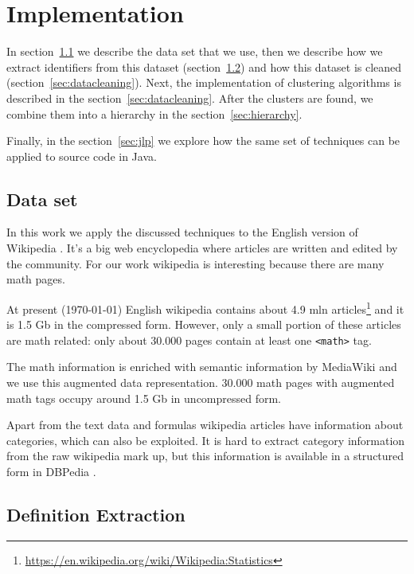 \section{Implementation}


In section~\ref{sec:dataset} we describe the data set that we use, 
then we describe how we extract identifiers from this dataset 
(section~\ref{sec:defextraction-impl}) and how this dataset is cleaned
(section~\ref{sec:datacleaning}). Next, the implementation of clustering
algorithms is described in the section~\ref{sec:datacleaning}. After
the clusters are found, we combine them into a hierarchy in 
the section~\ref{sec:hierarchy}. 

Finally, in the section~\ref{sec:jlp} we explore how the same set of techniques
can be applied to source code in Java.


\subsection{Data set} \label{sec:dataset}

In this work we apply the discussed techniques to the English version of
Wikipedia \cite{enwikidump}.
It's a big web encyclopedia where articles are written and edited by 
the community. For our work wikipedia is interesting because 
there are many math pages. 


At present (\today) English wikipedia contains about 4.9 mln
articles\footnote{\url{https://en.wikipedia.org/wiki/Wikipedia:Statistics}}
and it is 1.5 Gb in the compressed form. However, only a small portion
of these articles are math related: only about 30.000 pages contain at least 
one \verb|<math>| tag. 

The math information is enriched with semantic information by MediaWiki 
and we use this augmented data representation. 30.000 math pages with 
augmented math tags occupy around 1.5 Gb in uncompressed form. 

Apart from the text data and formulas wikipedia articles have information
about categories, which can also be exploited. It is hard to 
extract category information from the raw wikipedia mark up, but this 
information is available in a structured form in DBPedia \cite{bizer2009dbpedia}.


\subsection{Definition Extraction} \label{sec:defextraction-impl}

